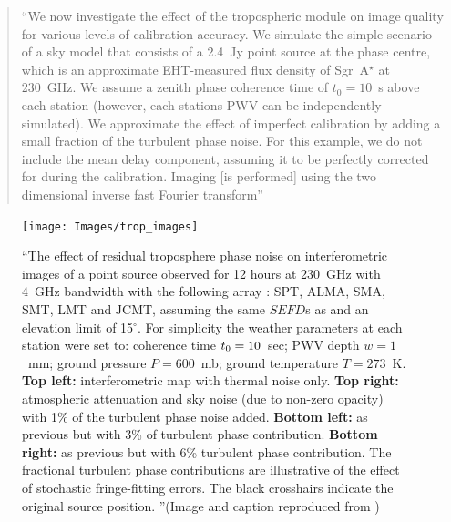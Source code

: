 \begin{quotation}
``We now investigate the effect of the tropospheric module on image quality for various levels of calibration accuracy. We simulate the simple scenario of a sky model that consists of a 2.4~Jy point source at the phase centre, which is an approximate EHT-measured flux density of Sgr~A$^\star$ at 230~GHz. We assume a zenith phase coherence time of $t_0=10$~s above each station (however, each stations PWV can be independently simulated). We approximate the effect of imperfect calibration by adding a small fraction of the turbulent phase noise. For this example, we do not include the mean delay component, assuming it to be perfectly corrected for during the calibration. Imaging [is performed] using the two dimensional inverse fast Fourier transform''\\
\citep{Blecher_2016}
\end{quotation}

\begin{figure}[h!]
\texttt{[image: Images/trop\_images]}
\caption[The effect of increasing levels residual troposphere phase noise on interferometric images of a point source observed with an 8 station EHT array for 12 hours at 230~GHz.]{``The effect of residual troposphere phase noise on interferometric images of a point source observed for 12 hours at 230~GHz with 4~GHz bandwidth with the following array : SPT, ALMA, SMA, SMT, LMT and JCMT, assuming the same $SEFD$s as \protect\citet{Lu_2014} and an elevation limit of 15$^\circ$. For simplicity the weather parameters at each station were set to: coherence time $t_{\rm 0}=10$~sec; PWV depth $w=1$~mm; ground pressure $P=600$~mb; ground temperature $T =273$~K. {\bf Top left:} interferometric map with thermal noise only. {\bf Top right:} atmospheric attenuation and sky noise (due to non-zero opacity) with 1\% of the turbulent phase noise added. {\bf Bottom left:} as previous but with 3\% of turbulent phase contribution. {\bf Bottom right:} as previous but with 6\% turbulent phase contribution. The fractional turbulent phase contributions are illustrative of the effect of stochastic fringe-fitting errors. The black crosshairs indicate the original source position. ''(Image and caption reproduced from \citet{Blecher_2016}) \label{fig:trop_images}%
}
\end{figure}


